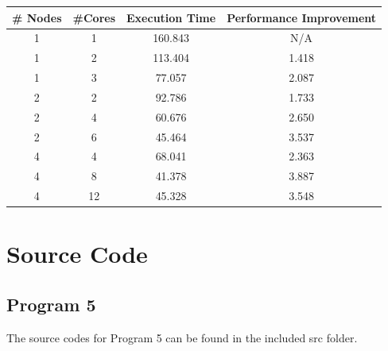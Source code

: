 \documentclass{article}
\begin{document}
		\begin{minipage}{\linewidth}
			\centering
			\begin{tabular}{c|c|cc}\label{T2}
				\# Nodes 	& \#Cores 	& Execution Time 	& Performance Improvement	\\
				\hline
				1			& 1 		& 160.843			& N/A	\\
				1			& 2 		& 113.404			& 1.418	\\
				1			& 3 		& 77.057			& 2.087	\\
				2			& 2 		& 92.786			& 1.733	\\
				2			& 4 		& 60.676			& 2.650	\\
				2			& 6 		& 45.464			& 3.537	\\
				4			& 4 		& 68.041			& 2.363	\\
				4			& 8 		& 41.378			& \color{red}3.887	\\
				4			& 12 		& 45.328			& 3.548	\\
			\end{tabular}
		\smallskip\smallskip\smallskip\smallskip
		\end{minipage}


\pagebreak
	
	\section{Source Code} \label{SRC}
		\subsection{Program 5} \label{P5_SRC}
		The source codes for Program 5 can be found in the included src folder.\\
	
	
\end{document}
